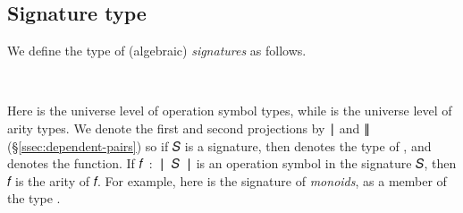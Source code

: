 \documentclass[a4paper,UKenglish,cleveref,autoref,thm-restate]{lipics-v2021}
\begin{document}
\subsection{Signature type}\label{signature-type}
We define the type of (algebraic) \emph{signatures} as follows.
\ccpad
\begin{code}%
\>[0]\AgdaSpace{}%
\AgdaSymbol{:}\AgdaSpace{}%
\AgdaSymbol{(}\AgdaSpace{}%
\AgdaSpace{}%
\AgdaSymbol{:}\AgdaSpace{}%
\AgdaSymbol{)}\AgdaSpace{}%
\AgdaSpace{}%
\AgdaSymbol{(}\AgdaSpace{}%
\AgdaSpace{}%
\AgdaSymbol{)}\AgdaSpace{}%
\AgdaSpace{}%
\<%
\\
\>[0]\AgdaSpace{}%
\AgdaSpace{}%
\AgdaSpace{}%
\AgdaSymbol{=}\AgdaSpace{}%
\AgdaSpace{}%
\AgdaSpace{}%
\AgdaSpace{}%
\AgdaSpace{}%
\AgdaSpace{}%
\AgdaFunction{,}\AgdaSpace{}%
\AgdaSymbol{(}\AgdaSpace{}%
\AgdaSpace{}%
\AgdaSpace{}%
\AgdaSymbol{)}\<%
\end{code}
\ccpad
Here  is the universe level of operation symbol types, while  is the universe level of arity types. We denote the first and second projections by \ai ∣ and \ai ∥ (\S\ref{ssec:dependent-pairs}) so if \ab 𝑆 is a signature, then  denotes the type of , and  denotes the  function. If \ab 𝑓~\as :~\af ∣~\ab 𝑆~\af ∣ is an operation symbol in the signature \ab 𝑆, then  \ab 𝑓 is the arity of \ab 𝑓. For example, %
here is the signature of \emph{monoids}, as a member of the type   .
\ccpad
\end{document}

